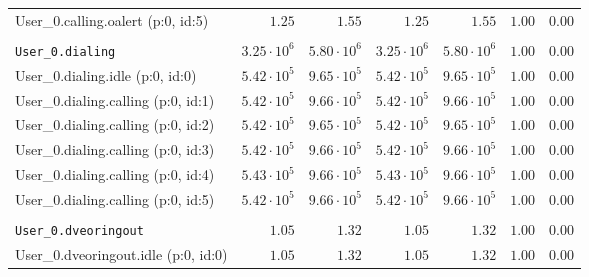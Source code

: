 \begin{table}[htbp]
{\begin{tabular}{lrrrrrr}
\hspace{3mm}User\_0.calling.oalert (p:0, id:5)        &               $1.25$ &               $1.55$ &               $1.25$ &               $1.55$ &               $1.00$ &               $0.00$ \\
\\[-8pt]\texttt{User\_0.dialing}                      &  $3.25 \cdot 10^{6}$ &  $5.80 \cdot 10^{6}$ &  $3.25 \cdot 10^{6}$ &  $5.80 \cdot 10^{6}$ &               $1.00$ &               $0.00$ \\
\hspace{3mm}User\_0.dialing.idle (p:0, id:0)          &  $5.42 \cdot 10^{5}$ &  $9.65 \cdot 10^{5}$ &  $5.42 \cdot 10^{5}$ &  $9.65 \cdot 10^{5}$ &               $1.00$ &               $0.00$ \\
\hspace{3mm}User\_0.dialing.calling (p:0, id:1)       &  $5.42 \cdot 10^{5}$ &  $9.66 \cdot 10^{5}$ &  $5.42 \cdot 10^{5}$ &  $9.66 \cdot 10^{5}$ &               $1.00$ &               $0.00$ \\
\hspace{3mm}User\_0.dialing.calling (p:0, id:2)       &  $5.42 \cdot 10^{5}$ &  $9.65 \cdot 10^{5}$ &  $5.42 \cdot 10^{5}$ &  $9.65 \cdot 10^{5}$ &               $1.00$ &               $0.00$ \\
\hspace{3mm}User\_0.dialing.calling (p:0, id:3)       &  $5.42 \cdot 10^{5}$ &  $9.66 \cdot 10^{5}$ &  $5.42 \cdot 10^{5}$ &  $9.66 \cdot 10^{5}$ &               $1.00$ &               $0.00$ \\
\hspace{3mm}User\_0.dialing.calling (p:0, id:4)       &  $5.43 \cdot 10^{5}$ &  $9.66 \cdot 10^{5}$ &  $5.43 \cdot 10^{5}$ &  $9.66 \cdot 10^{5}$ &               $1.00$ &               $0.00$ \\
\hspace{3mm}User\_0.dialing.calling (p:0, id:5)       &  $5.42 \cdot 10^{5}$ &  $9.66 \cdot 10^{5}$ &  $5.42 \cdot 10^{5}$ &  $9.66 \cdot 10^{5}$ &               $1.00$ &               $0.00$ \\
\\[-8pt]\texttt{User\_0.dveoringout}                  &               $1.05$ &               $1.32$ &               $1.05$ &               $1.32$ &               $1.00$ &               $0.00$ \\
\hspace{3mm}User\_0.dveoringout.idle (p:0, id:0)      &               $1.05$ &               $1.32$ &               $1.05$ &               $1.32$ &               $1.00$ &               $0.00$ \\

\end{tabular}}
\end{table}
